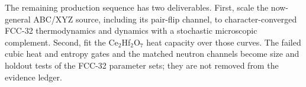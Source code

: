 \documentclass[aps,prl,onecolumn,amsmath,amssymb]{revtex4-2}
\begin{document}
The remaining production sequence has two deliverables.  First, scale the
now-general ABC/XYZ source, including its pair-flip channel, to
character-converged FCC-32 thermodynamics and dynamics with a
stochastic microscopic complement.  Second, fit the Ce$_2$Hf$_2$O$_7$ heat
capacity over those curves.  The failed cubic heat and entropy gates and the
matched neutron channels become size and holdout tests of the FCC-32 parameter
sets; they are not removed from the evidence ledger.


\end{document}

